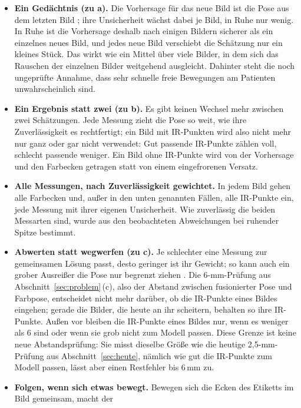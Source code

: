 \documentclass[11pt,a4paper,fleqn]{article}
\begin{document}
\begin{itemize}
  \item \textbf{Ein Gedächtnis (zu a).} Die Vorhersage für das neue Bild ist die Pose aus dem letzten Bild
        \cite[Bsp.~4.1, 4.2]{saerkkae2013bayesian}; ihre Unsicherheit wächst dabei je Bild, in Ruhe nur wenig. In
        Ruhe ist die Vorhersage deshalb nach einigen Bildern sicherer als ein einzelnes neues Bild, und jedes neue
        Bild verschiebt die Schätzung nur ein kleines Stück. Das wirkt wie ein Mittel über viele Bilder, in dem
        sich das Rauschen der einzelnen Bilder weitgehend ausgleicht. Dahinter steht die noch ungeprüfte Annahme,
        dass sehr schnelle freie Bewegungen am Patienten unwahrscheinlich sind.
  \item \textbf{Ein Ergebnis statt zwei (zu b).} Es gibt keinen Wechsel mehr zwischen zwei Schätzungen. Jede
        Messung zieht die Pose so weit, wie ihre Zuverlässigkeit es rechtfertigt; ein Bild mit IR-Punkten wird
        also nicht mehr nur ganz oder gar nicht verwendet: Gut passende IR-Punkte zählen voll, schlecht passende
        weniger. Ein Bild ohne IR-Punkte wird von der Vorhersage und den Farbecken getragen statt von einem
        eingefrorenen Versatz.
  \item \textbf{Alle Messungen, nach Zuverlässigkeit gewichtet.} In jedem Bild gehen alle Farbecken und, außer in
        den unten genannten Fällen, alle IR-Punkte ein, jede Messung mit ihrer eigenen Unsicherheit. Wie
        zuverlässig die beiden Messarten sind, wurde aus den beobachteten Abweichungen bei ruhender Spitze
        bestimmt.
  \item \textbf{Abwerten statt wegwerfen (zu c).} Je schlechter eine Messung zur gemeinsamen Lösung passt, desto
        geringer ist ihr Gewicht; so kann auch ein grober Ausreißer die Pose nur begrenzt ziehen
        \cite[§9.4]{zhang1997parameter}. Die 6-mm-Prüfung aus Abschnitt~\ref{sec:problem}\,(c), also der Abstand
        zwischen fusionierter Pose und Farbpose, entscheidet nicht mehr darüber, ob die IR-Punkte eines Bildes
        eingehen; gerade die Bilder, die heute an ihr scheitern, behalten so ihre IR-Punkte. Außen vor bleiben die
        IR-Punkte eines Bildes nur, wenn es weniger als 6 sind oder wenn sie grob nicht zum Modell passen. Diese
        Grenze ist keine neue Abstandsprüfung: Sie misst dieselbe Größe wie die heutige 2,5-mm-Prüfung aus
        Abschnitt~\ref{sec:heute}, nämlich wie gut die IR-Punkte zum Modell passen, lässt aber einen Restfehler bis
        6\,mm zu.
  \item \textbf{Folgen, wenn sich etwas bewegt.} Bewegen sich die Ecken des Etiketts im Bild gemeinsam, macht der

\end{itemize}
\end{document}
